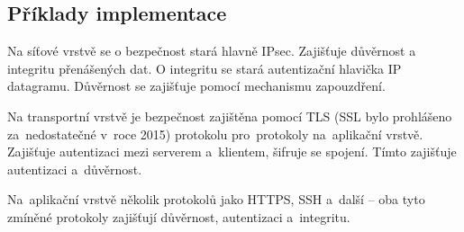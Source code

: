 \subsection{Příklady implementace}

Na síťové vrstvě se o bezpečnost stará hlavně IPsec. Zajišťuje důvěrnost a integritu přenášených dat. O integritu se stará autentizační hlavička IP datagramu. Důvěrnost se zajišťuje pomocí mechanismu zapouzdření.

Na transportní vrstvě je bezpečnost zajištěna pomocí TLS (SSL bylo prohlášeno za~nedostatečné v~roce 2015) protokolu pro~protokoly na~aplikační vrstvě. Zajišťuje autentizaci mezi serverem a~klientem, šifruje se spojení. Tímto zajišťuje autentizaci a~důvěrnost.

Na~aplikační vrstvě několik protokolů jako HTTPS, SSH a~další -- oba tyto zmíněné protokoly zajišťují důvěrnost, autentizaci a~integritu.
